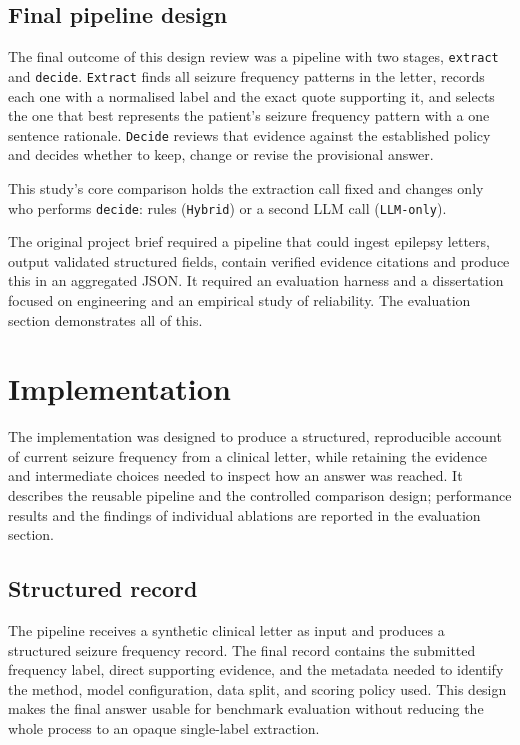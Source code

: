 \documentclass[conference]{IEEEtran}
\begin{document}
\subsection{Final pipeline design}

The final outcome of this design review was a 
pipeline with two stages, 
\texttt{extract} and \texttt{decide}. \texttt{Extract} 
finds all seizure frequency patterns in the letter, 
records each one with a normalised label and
the exact quote supporting it, and selects the
one that best represents the patient's seizure
frequency pattern with a one sentence rationale.
\texttt{Decide} reviews that evidence against 
the established policy and decides whether to
keep, change or revise the provisional answer.

This study's core comparison holds the extraction call 
fixed and changes only who performs \texttt{decide}: 
rules (\texttt{Hybrid}) or a second LLM call 
(\texttt{LLM-only}). 

The original project brief required a pipeline that
could ingest epilepsy letters, output validated 
structured fields, contain verified evidence citations
and produce this in an aggregated JSON. It required
an evaluation harness and a dissertation focused 
on engineering and an empirical study of reliability.
The evaluation section demonstrates all of this.

\section{Implementation}

The implementation was designed to produce a structured, 
reproducible account of current seizure frequency from 
a clinical letter, while retaining the evidence and 
intermediate choices needed to inspect how an answer 
was reached. It describes the reusable pipeline and the 
controlled comparison design; performance results and 
the findings of individual ablations are reported in the 
evaluation section.

\subsection{Structured record}

The pipeline receives a synthetic clinical letter as input
and produces a structured seizure frequency record. The 
final record contains the submitted frequency label, direct 
supporting evidence, and the metadata needed to identify 
the method, model configuration, data split, and scoring 
policy used. This design makes the final answer usable for 
benchmark evaluation without reducing the whole process 
to an opaque single-label extraction.
\end{document}
